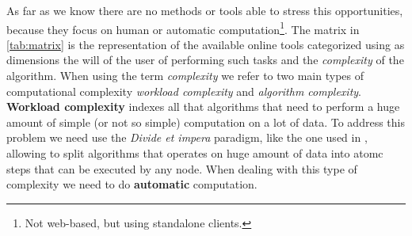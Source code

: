 
As far as we know there are no methods or tools able to stress this opportunities,
because they focus on human or automatic computation\footnote{Not web-based, but
using standalone clients.}. The matrix in \autoref{tab:matrix} is the representation
of the available online tools categorized using as dimensions the will of the user
of performing such tasks and the \emph{complexity} of the algorithm.
When using the term \emph{complexity} we refer to two main types of computational
complexity \emph{workload complexity} and \emph{algorithm complexity}.\\

\textbf{Workload complexity} indexes all that algorithms that need to perform a
huge amount of simple (or not so simple) computation on a lot of data. To address
this problem we need use the \emph{Divide et impera} paradigm, like the one used
in \cite{dean2008mapreduce}, allowing to split algorithms that operates on huge
amount of data into atomc steps that can be executed by any node. When dealing
with this type of complexity we need to do \textbf{automatic} computation.

